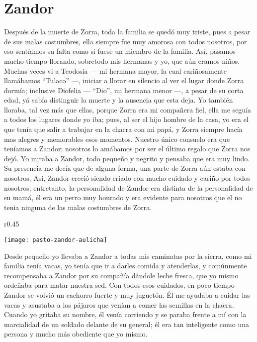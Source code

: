 \cleardoublepage
\newpage
\ifdefined\EnableIncludeImages
\fi
\chapter{Zandor}
Después de la muerte de Zorra, toda la familia se quedó muy triste, pues a pesar de sus malas costumbres, ella siempre fue muy amorosa con todos nosotros, por eso sentíamos su falta como si fuese un miembro de la familia.
Así, pasamos mucho tiempo llorando, sobretodo mis hermanas y yo, que aún eramos niños.
Muchas veces vi a Teodosia --- mi hermana mayor, la cual cariñosamente llamábamos ``Tulaco'' ---, iniciar a llorar en silencio al ver el lugar donde Zorra dormía; inclusive Diofelia --- ``Dio'', mi hermana menor ---, a pesar de su corta edad, yá sabía distinguir la muerte y la ausencia que esta deja.
Yo también lloraba, tal vez más que ellas, porque Zorra era mi compañera fiel, ella me seguía a todos los lugares donde yo iba; pues, al ser el hijo hombre de la casa, yo era el que tenía que salir a trabajar en la chacra con mi papá, y Zorra siempre hacía mas alegres y memorables esos momentos.
Nuestro único consuelo era que teníamos a Zandor; nosotros lo amábamos por ser el último regalo que Zorra nos dejó.
Yo miraba a Zandor, todo pequeño y negrito y pensaba que era muy lindo. Su presencia me decía que de alguna forma, una parte de Zorra aún estaba con nosotros.
Así, Zandor creció siendo criado con mucho cuidado y cariño por todos nosotros;
entretanto, la personalidad de Zandor era distinta de la personalidad de su mamá, él era un perro muy honrado y era evidente para nosotros que el no tenia ninguna de las malas costumbres de Zorra.
\ifdefined\EnableIncludeImages
\begin{wrapfigure}{r}{0.45\textwidth}
  \begin{center}
  \vspace{-20pt}
    \texttt{[image: pasto-zandor-aulicha]}
  \end{center}
  \vspace{-20pt}
\end{wrapfigure}
\fi
Desde pequeño yo llevaba a Zandor a todas mis caminatas por la sierra, como mi familia tenía vacas, yo tenía que ir a darles comida y atenderlas, y comúnmente recompensaba a Zandor por su compañía dándole leche fresca, que yo mismo ordeñaba para matar nuestra sed.
Con todos esos cuidados, en poco tiempo Zandor se volvió un cachorro fuerte y muy juguetón.
Él me ayudaba a cuidar las vacas y asustaba a los pájaros que venían a comer las semillas en la chacra. Cuando yo gritaba su nombre, él venía corriendo y se paraba frente a mí con la marcialidad de un soldado delante de su general; él era tan inteligente como una persona y mucho más obediente que yo mismo.

